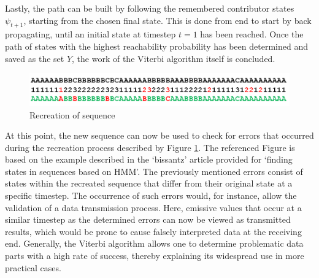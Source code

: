 \documentclass[12pt,journal,compsoc]{IEEEtran}
\begin{document}
Lastly, the path can be built by following the remembered contributor states $\psi_{t+1}$, starting from the chosen final state. This is done from end to start by back propagating, until an initial state at timestep $t=1$ has been reached. Once the path of states with the highest reachability probability has been determined and saved as the set $Y$, the work of the Viterbi algorithm itself is concluded. 
\begin{figure}[H]
	\centering
	\includegraphics[scale=0.25]{figures/reconstruction.png}
	\caption{Recreation of sequence \cite{article:bissantz}}
	\label{figRecreation}
\end{figure}
At this point, the new sequence can now be used to check for errors that occurred during the recreation process described by Figure \ref{figRecreation}. The referenced Figure is based on the example described in the ‘bissantz’ \cite{article:bissantz} article provided for ‘finding states in sequences based on HMM’. The previously mentioned errors consist of states within the recreated sequence that differ from their original state at a specific timestep. The occurrence of such errors would, for instance, allow the validation of a data transmission process. Here, emissive values that occur at a similar timestep as the determined errors can now be viewed as transmitted results, which would be prone to cause falsely interpreted data at the receiving end. Generally, the Viterbi algorithm allows one to determine problematic data parts with a high rate of success, thereby explaining its widespread use in more practical cases. 
\end{document}
